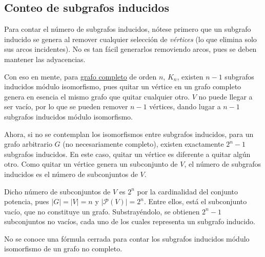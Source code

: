 \begin{center}
\end{center}

\subsection{Conteo de subgrafos inducidos}
\label{sec:cuantos_subgrafos_inducidos}

Para contar el número de subgrafos inducidos, nótese primero que un subgrafo inducido se genera al remover cualquier selección de \emph{vértices} (lo que elimina solo sus arcos incidentes). No es tan fácil generarlos removiendo arcos, pues se deben mantener las adyacencias.

Con eso en mente, para \hyperref[sec:grafo_completo]{grafo completo} de orden $n$, \(K_n\), existen \(n-1\) subgrafos inducidos módulo isomorfismo, pues quitar un vértice en un grafo completo genera en esencia el mismo grafo que quitar cualquier otro. \(V\) no puede llegar a ser vacío, por lo que se pueden remover \(n-1\) vértices, dando lugar a \(n-1\) subgrafos inducidos módulo isomorfismo.

Ahora, si no se contemplan los isomorfismos entre subgrafos inducidos, para un grafo arbitrario \(G\) (no necesariamente completo), existen exactamente \(2^n-1\) subgrafos inducidos. En este caso, quitar un vértice es diferente a quitar algún otro. Como quitar un vértice genera un subconjunto de \(V\), el número de subgrafos inducidos es el número de subconjuntos de \(V\).

Dicho número de subconjuntos de \(V\) es \(2^n\) por la cardinalidad del conjunto potencia, pues \(|G|=|V|=n\) y \(|\mathcal{P}(V)| = 2^n\). Entre ellos, está el subconjunto vacío, que no constituye un grafo. Substrayéndolo, se obtienen \(2^{n}-1\) subconjuntos no vacíos, cada uno de los cuales representa un subgrafo inducido.

No se conoce una fórmula cerrada para contar los subgrafos inducidos módulo isomorfismo de un grafo no completo.

